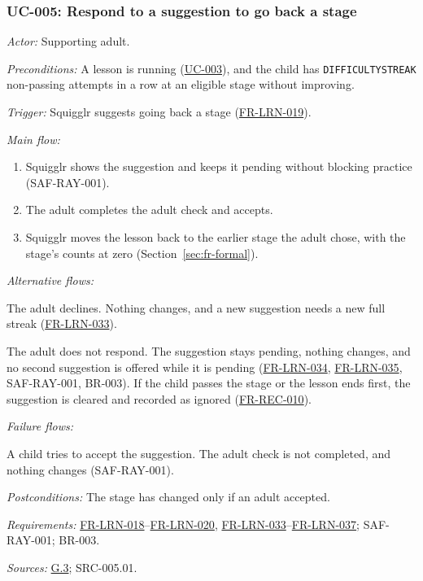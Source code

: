 \documentclass[12pt]{article}
\renewcommand{\_}{\textunderscore\allowbreak}%
\newcommand{\goalref}[1]{\hyperref[goal:#1]{G.#1}}
\newcommand{\ucref}[1]{\hyperref[uc:#1]{\mbox{UC-#1}}}
\newcommand{\reqfield}[2]{\noindent\textit{#1:} #2\par}
\newcommand{\reqref}[1]{\hyperref[req:#1]{#1}}
\providecommand{\ucref}[1]{\hyperref[uc:#1]{UC-#1}}
\begin{document}
\subsubsection{UC-005: Respond to a suggestion to go back a stage}
\label{puc:005}
\reqfield{Actor}{Supporting adult.}
\reqfield{Preconditions}{A lesson is running (\ucref{003}), and the child has
\texttt{DIFFICULTY\_STREAK} non-passing attempts in a row at an eligible stage
without improving.} \reqfield{Trigger}{Squigglr suggests going back a stage
(\mbox{\reqref{FR-LRN-019}}).} \noindent\textit{Main flow:}
\begin{enumerate}[nosep, leftmargin=2.2em]
  \item Squigglr shows the suggestion and keeps it pending without blocking
  practice (\mbox{SAF-RAY-001}).
  \item The adult completes the adult check and accepts.
  \item Squigglr moves the lesson back to the earlier stage the adult chose,
  with the stage's counts at zero (Section~\ref{sec:fr-formal}).
\end{enumerate}
\noindent\textit{Alternative flows:}
\begin{description}[nosep, leftmargin=2.2em, font=\normalfont]
  \item[2a.] The adult declines. Nothing changes, and a new suggestion needs a
  new full streak (\mbox{\reqref{FR-LRN-033}}).
  \item[2b.] The adult does not respond. The suggestion stays pending, nothing
  changes, and no second suggestion is offered while it is pending
  (\mbox{\reqref{FR-LRN-034}}, \mbox{\reqref{FR-LRN-035}}, \mbox{SAF-RAY-001}, BR-003). If the child passes the stage or the lesson
  ends first, the suggestion is cleared and recorded as ignored
  (\mbox{\reqref{FR-REC-010}}).
\end{description}
\noindent\textit{Failure flows:}
\begin{description}[nosep, leftmargin=2.2em, font=\normalfont]
  \item[2c.] A child tries to accept the suggestion. The adult check is not
  completed, and nothing changes (\mbox{SAF-RAY-001}).
\end{description}
\reqfield{Postconditions}{The stage has changed only if an adult accepted.}
\reqfield{Requirements}{\mbox{\reqref{FR-LRN-018}}--\mbox{\reqref{FR-LRN-020}}, \mbox{\reqref{FR-LRN-033}}--\mbox{\reqref{FR-LRN-037}};
\mbox{SAF-RAY-001}; BR-003.} \reqfield{Sources}{\goalref{3}; \mbox{SRC-005.01}.}
\end{document}

